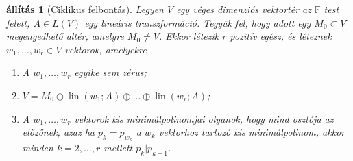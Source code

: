 \documentclass[a4paper, showtrims]{memoir}
\theoremstyle{plain}
\newtheorem{proposition}{állítás}[chapter]
\theoremstyle{remark}
\theoremstyle{definition}
\DeclareMathOperator{\lin}{lin}
\begin{document}
\begin{proposition}[Ciklikus felbontás]
    Legyen $V$ egy véges dimenziós vektortér az $\mathbb{F}$ test felett, $A\in L\left( V \right)$ egy lineáris transzformáció.
    Tegyük fel, hogy adott egy $M_0\subset V$ megengedhető altér, amelyre $M_0\neq V$.
    Ekkor létezik $r$ pozitív egész, és léteznek $w_1,\dots,w_r\in V$ vektorok, amelyekre
    \begin{enumerate}
        \item A $w_1,\dots,w_r$ egyike sem zérus;
        \item $V=M_0\oplus\lin\left( w_1;A \right)\oplus\ldots\oplus\lin\left( w_r;A \right)$;
        \item A $w_1,\dots,w_r$ vektorok kis minimálpolinomjai olyanok, hogy mind osztója az előzőnek, 
            azaz ha $p_k=p_{w_k}$ a $w_k$ vektorhoz tartozó kis minimálpolinom, 
            akkor minden $k=2,\dots,r$ mellett $p_k|p_{k-1}$.\qedhere
    \end{enumerate}
\end{proposition}
\end{document}
